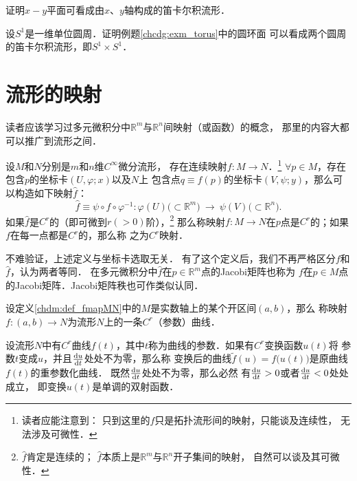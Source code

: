 \begin{exercise}
	证明$x-y$平面可看成由$x$、$y$轴构成的笛卡尔积流形．
\end{exercise}


\begin{exercise}
	设$S^1$是一维单位圆周．证明例题\ref{chcdg:exm_torus}中的圆环面
	可以看成两个圆周的笛卡尔积流形，即$S^1\times S^1$．
\end{exercise}


\section{流形的映射}\label{chdm:sec_map-dm}
读者应该学习过多元微积分中$\mathbb{R}^m$与$\mathbb{R}^n$间映射（或函数）的概念，
那里的内容大都可以推广到流形之间．
\begin{definition}\label{chdm:def_fmapMN}
    设$M$和$N$分别是$m$和$n$维$C^\infty$微分流形，
    存在连续映射$f:M\to N$．{\footnote{读者应能注意到：
            只到这里的$f$只是拓扑流形间的映射，只能谈及连续性，
            无法涉及可微性．}}
    $\forall p\in M$，存在包含$p$的坐标卡$(U,\varphi;x)$以及$N$上
    包含点$q\equiv f(p)$的坐标卡$(V,\psi;y)$，那么可以构造如下映射$\hat{f}$：
    \begin{equation*}
        \hat{f}\equiv \psi \circ f \circ \varphi^{-1} :
        \varphi(U) \bigl(\subset \mathbb{R}^m\bigr) \ \to \ 
        \psi(V) \bigl(\subset \mathbb{R}^n\bigr) .
    \end{equation*}
    如果$\hat{f}$是$C^r$的（即可微到$r(>0)$阶），{\footnote{$\hat{f}$肯定是连续的；
            $\hat{f}$本质上是$\mathbb{R}^m$与$\mathbb{R}^n$开子集间的映射，
            自然可以谈及其可微性．}}
    那么称映射$f:M\to N$在$p$点是$C^r$的；如果$f$在每一点都是$C^r$的，那么称
    之为$C^r$映射．
\end{definition}


\begin{remark}\label{chdm:rek_jacobi}
    不难验证，上述定义与坐标卡选取无关．
    有了这个定义后，我们不再严格区分$f$和$\hat{f}$，认为两者等同．
    在多元微积分中$\hat{f}$在$p\in \mathbb{R}^m$点的Jacobi矩阵也称为
    $f$在$p\in M$点的Jacobi矩阵．Jacobi矩阵秩也可作类似认同．
\end{remark}
\begin{definition}\label{chdm:def_fmapCurve}
    设定义\ref{chdm:def_fmapMN}中的$M$是实数轴上的某个开区间$(a,b)$，那么
    称映射$f:(a,b)\to N$为流形$N$上的一条$C^r${\heiti （参数）曲线}． 
\end{definition}
设流形$N$中有$C^r$曲线$f(t)$，其中$t$称为曲线的{\heiti 参数}．如果有$C^r$变换函数$u(t)$将
参数$t$变成$u$，并且$\frac{{\rm d} u }{{\rm d} t}$处处不为零，那么称
变换后的曲线$\tilde{f}(u)=f\bigl(u(t)\bigr)$是原曲线$f(t)$的{\heiti 重参数化曲线}．
既然$\frac{{\rm d} u }{{\rm d} t}$处处不为零，那么必然
有$\frac{{\rm d} u }{{\rm d} t}>0$或者$\frac{{\rm d} u }{{\rm d} t}<0$处处成立，
即变换$u(t)$是单调的双射函数．

